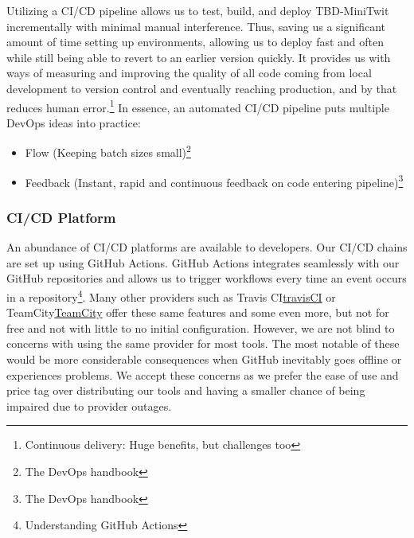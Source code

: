 Utilizing a CI/CD pipeline allows us to test, build, and deploy TBD-MiniTwit incrementally with minimal manual interference. Thus, saving us a significant amount of time setting up environments, allowing us to deploy fast and often while still being able to revert to an earlier version quickly.
It provides us with ways of measuring and improving the quality of all code coming from local development to version control and eventually reaching production, and by that reduces human error.\footnote{Continuous delivery: Huge benefits, but challenges too\cite{Chen2015}}
In essence, an automated CI/CD pipeline puts multiple DevOps ideas into practice: 
\begin{itemize}
    \item Flow (Keeping batch sizes small)\footnote{\label{handbook}The DevOps handbook\cite{Kim2016}} 
    \item Feedback (Instant, rapid and continuous feedback on code entering pipeline)\footnote{The DevOps handbook\cite{Kim2016}}
\end{itemize}


\subsubsection{CI/CD Platform}
\label{subsubsec:cicdPlatform}
An abundance of CI/CD platforms are available to developers. Our CI/CD chains are set up using GitHub Actions. GitHub Actions integrates seamlessly with our GitHub repositories and allows us to trigger workflows every time an event occurs in a repository\footnote{Understanding GitHub Actions\cite{githubActions}}. Many other providers such as Travis CI\href{https://travis-ci.org/}{travisCI} or TeamCity\href{https://www.jetbrains.com/teamcity/}{TeamCity} offer these same features and some even more, but not for free and not with little to no initial configuration. However, we are not blind to concerns with using the same provider for most tools. The most notable of these would be more considerable consequences when GitHub inevitably goes offline or experiences problems. We accept these concerns as we prefer the ease of use and price tag over distributing our tools and having a smaller chance of being impaired due to provider outages.

